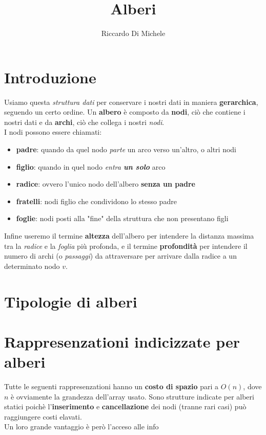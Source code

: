 \documentclass{article}
\title{Alberi}
\author{Riccardo Di Michele}
\begin{document}
\maketitle

\section*{Introduzione}
Usiamo questa \textit{struttura dati} per conservare i nostri dati in maniera \textbf{gerarchica},
seguendo un certo ordine. Un \textbf{albero} è composto da \textbf{nodi}, ciò che contiene i nostri dati
e da \textbf{archi}, ciò che collega i nostri \textit{nodi}. \\
I nodi possono essere chiamati:
\begin{itemize}
  \item \textbf{padre}: quando da quel nodo \textit{parte} un arco verso un'altro, o altri nodi
  \item \textbf{figlio}: quando in quel nodo \textit{entra \textbf{un solo}} arco
  \item \textbf{radice}: ovvero l'unico nodo dell'albero \textbf{senza un padre}
  \item \textbf{fratelli}: nodi figlio che condividono lo stesso padre
  \item \textbf{foglie}: nodi posti alla "fine" della struttura che non presentano figli
\end{itemize}

Infine useremo il termine \textbf{altezza} dell'albero per intendere la distanza massima tra la 
\textit{radice} e la \textit{foglia} più profonda, e il termine \textbf{profondità} per intendere 
il numero di archi (o \textit{passaggi}) da attraversare per arrivare dalla radice a un determinato
nodo $v$.

\section*{Tipologie di alberi}

\section*{Rappresenzationi indicizzate per alberi}
Tutte le seguenti rappresenzationi hanno un \textbf{costo di spazio} pari a $O(n)$, dove $n$ è ovviamente
la grandezza dell'array usato. Sono strutture indicate per alberi statici poichè l'\textbf{inserimento} e 
\textbf{cancellazione} dei nodi (tranne rari casi) può raggiungere costi elavati. \\
Un loro grande vantaggio è però l'acceso alle info
\end{document}
